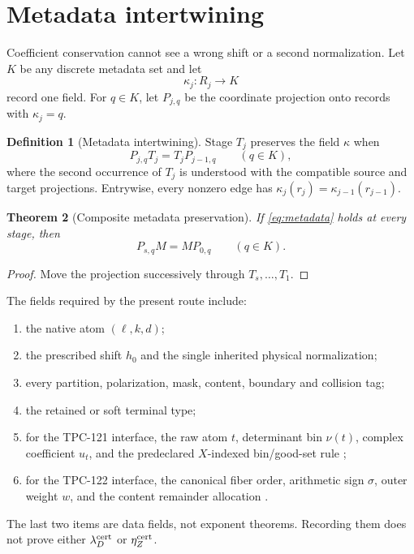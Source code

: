 \documentclass[11pt]{article}
\newtheorem{theorem}{Theorem}[section]
\theoremstyle{definition}
\newtheorem{definition}[theorem]{Definition}
\theoremstyle{remark}
\begin{document}
\section{Metadata intertwining}

Coefficient conservation cannot see a wrong shift or a second
normalization.  Let \(K\) be any discrete metadata set and let
\[
 \kappa_j:R_j\longrightarrow K
\]
record one field.  For \(q\in K\), let \(P_{j,q}\) be the coordinate
projection onto records with \(\kappa_j=q\).

\begin{definition}[Metadata intertwining]
Stage \(T_j\) preserves the field \(\kappa\) when
\begin{equation}
 P_{j,q}T_j=T_jP_{j-1,q}
 \qquad(q\in K),
 \label{eq:metadata}
\end{equation}
where the second occurrence of \(T_j\) is understood with the
compatible source and target projections.  Entrywise, every nonzero
edge has \(\kappa_j(r_j)=\kappa_{j-1}(r_{j-1})\).
\end{definition}

\begin{theorem}[Composite metadata preservation]
\label{thm:metadata}
If \eqref{eq:metadata} holds at every stage, then
\[
 P_{s,q}M=MP_{0,q}
 \qquad(q\in K).
\]
\end{theorem}

\begin{proof}
Move the projection successively through \(T_s,\ldots,T_1\).
\end{proof}

The fields required by the present route include:
\begin{enumerate}[label=\textbf{F\arabic*.},leftmargin=2.7em]
\item the native atom \((\ell,k,d)\);
\item the prescribed shift \(h_0\) and the single inherited physical
normalization;
\item every partition, polarization, mask, content, boundary and
collision tag;
\item the retained or soft terminal type;
\item for the TPC-121 interface, the raw atom \(t\), determinant bin
\(\nu(t)\), complex coefficient \(u_t\), and the predeclared
\(X\)-indexed bin/good-set rule \citep{WangTPC121};
\item for the TPC-122 interface, the canonical fiber order, arithmetic
sign \(\sigma\), outer weight \(w\), and the content remainder
allocation \citep{WangTPC122}.
\end{enumerate}
The last two items are data fields, not exponent theorems.  Recording
them does not prove either \(\lambda_D^{\rm cert}\) or
\(\eta_Z^{\rm cert}\).
\end{document}
